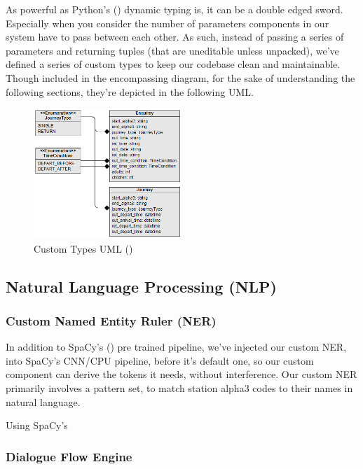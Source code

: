 \documentclass[11pt]{article}
\begin{document}
As powerful as Python's (\cite{python}) dynamic typing is, it can be a double edged sword. Especially when you consider the number of parameters components in our system have to pass between each other. As such, instead of passing a series of parameters and returning tuples (that are uneditable unless unpacked), we've defined a series of custom types to keep our codebase clean and maintainable. Though included in the encompassing diagram, for the sake of understanding the following sections, they're depicted in the following UML.

\begin{figure}[h]
    \centering
    \includegraphics[width=0.5\textwidth]{images/UML_utils.png}
    \caption{Custom Types UML (\cite{visual-paradigm})}
    \label{fig:custom-types-uml}
\end{figure}


\subsection{Natural Language Processing (NLP)} \label{nlp-design}


\subsubsection{Custom Named Entity Ruler (NER)} \label{named-entity-ruler-design}

In addition to SpaCy's (\cite{spacy}) pre trained pipeline, we've injected our custom NER, into SpaCy's CNN/CPU pipeline, before it's default one, so our custom component can derive the tokens it needs, without interference. Our custom NER primarily involves a pattern set, to match station alpha3 codes to their names in natural language.

Using SpaCy's 


\subsubsection{Dialogue Flow Engine} \label{dialogue-flow-design}
\end{document}

